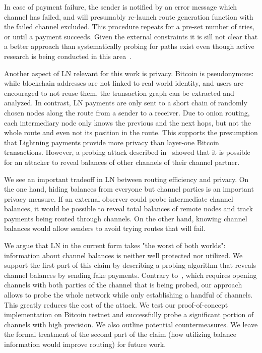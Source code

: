 In case of payment failure, the sender is notified by an error message which channel has failed, and will presumably re-launch route generation function with the failed channel excluded.
This procedure repeats for a pre-set number of tries, or until a payment succeeds.
Given the external constraints it is sill not clear that a better approach than systematically probing for paths exist even though active research is being conducted in this area~\cite{Pickhardt2019a, Prihodko2016, Grunspan2018, Pickhardt2019, Piatkivskyi2018, Sivaraman2018, Bagaria2019, Roos2018}.

Another aspect of LN relevant for this work is privacy.
Bitcoin is pseudonymous: while blockchain addresses are not linked to real world identity, and users are encouraged to not reuse them, the transaction graph can be extracted and analyzed.
In contrast, LN payments are only sent to a short chain of randomly chosen nodes along the route from a sender to a receiver.
Due to onion routing, each intermediary node only knows the previous and the next hops, but not the whole route and even not its position in the route.
This supports the presumption that Lightning payments provide more privacy than layer-one Bitcoin transactions.
However, a probing attack described in~\cite{Dam2019} showed that it is possible for an attacker to reveal balances of other channels of their channel partner.

We see an important tradeoff in LN between routing efficiency and privacy.
On the one hand, hiding balances from everyone but channel parties is an important privacy measure.
If an external observer could probe intermediate channel balances, it would be possible to reveal total balances of remote nodes and track payments being routed through channels.
On the other hand, knowing channel balances would allow senders to avoid trying routes that will fail.

We argue that LN in the current form takes "the worst of both worlds": information about channel balances is neither well protected nor utilized.
We support the first part of this claim by describing a probing algorithm that reveals channel balances by sending fake payments.
Contrary to~\cite{Dam2019}, which requires opening channels with both parties of the channel that is being probed, our approach allows to probe the whole network while only establishing a handful of channels.
This greatly reduces the cost of the attack.
We test our proof-of-concept implementation on Bitcoin testnet and successfully probe a significant portion of channels with high precision.
We also outline potential countermeasures.
We leave the formal treatment of the second part of the claim (how utilizing balance information would improve routing) for future work.


